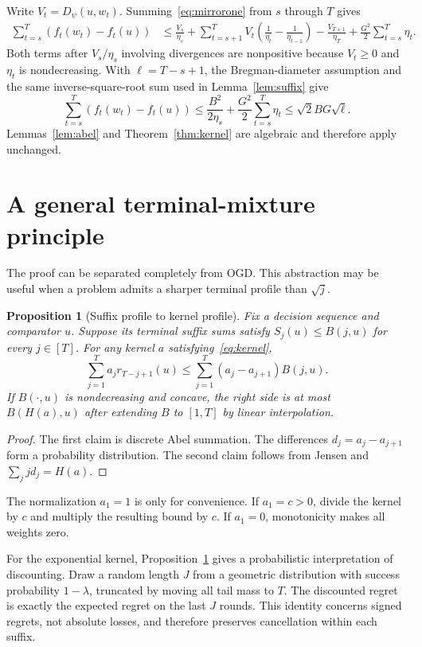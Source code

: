 \documentclass{article}
\newtheorem{proposition}[theorem]{Proposition}
\begin{document}
Write $V_t=D_\psi(u,w_t)$. Summing~\eqref{eq:mirrorone} from $s$ through $T$ gives
\begin{align}
\sum_{t=s}^T(f_t(w_t)-f_t(u))
&\le\frac{V_s}{\eta_s}+\sum_{t=s+1}^TV_t\left(\frac1{\eta_t}-\frac1{\eta_{t-1}}\right)-\frac{V_{T+1}}{\eta_T}+\frac{G^2}{2}\sum_{t=s}^T\eta_t.
\end{align}
Both terms after $V_s/\eta_s$ involving divergences are nonpositive because $V_t\ge0$ and $\eta_t$ is nondecreasing. With $\ell=T-s+1$, the Bregman-diameter assumption and the same inverse-square-root sum used in Lemma~\ref{lem:suffix} give \[ \sum_{t=s}^T(f_t(w_t)-f_t(u))\le\frac{B^2}{2\eta_s}+\frac{G^2}{2}\sum_{t=s}^T\eta_t\le\sqrt2BG\sqrt\ell. \] Lemmas~\ref{lem:abel} and Theorem~\ref{thm:kernel} are algebraic and therefore apply unchanged.

\section{A general terminal-mixture principle}
\label{app:mixture}

The proof can be separated completely from OGD. This abstraction may be useful when a problem admits a sharper terminal profile than $\sqrt j$.

\begin{proposition}[Suffix profile to kernel profile]
\label{prop:profile}
Fix a decision sequence and comparator $u$. Suppose its terminal suffix sums satisfy $S_j(u)\le B(j,u)$ for every $j\in[T]$. For any kernel $a$ satisfying~\eqref{eq:kernel},
\begin{equation}
\sum_{j=1}^Ta_jr_{T-j+1}(u)\le\sum_{j=1}^T(a_j-a_{j+1})B(j,u).
\label{eq:profile}
\end{equation}
If $B(\cdot,u)$ is nondecreasing and concave, the right side is at most $B(H(a),u)$ after extending $B$ to $[1,T]$ by linear interpolation.
\end{proposition}

\begin{proof}
The first claim is discrete Abel summation. The differences $d_j=a_j-a_{j+1}$ form a probability distribution. The second claim follows from Jensen and $\sum_jjd_j=H(a)$.
\end{proof}

The normalization $a_1=1$ is only for convenience. If $a_1=c>0$, divide the kernel by $c$ and multiply the resulting bound by $c$. If $a_1=0$, monotonicity makes all weights zero.

For the exponential kernel, Proposition~\ref{prop:profile} gives a probabilistic interpretation of discounting. Draw a random length $J$ from a geometric distribution with success probability $1-\lambda$, truncated by moving all tail mass to $T$. The discounted regret is exactly the expected regret on the last $J$ rounds. This identity concerns signed regrets, not absolute losses, and therefore preserves cancellation within each suffix.
\end{document}
